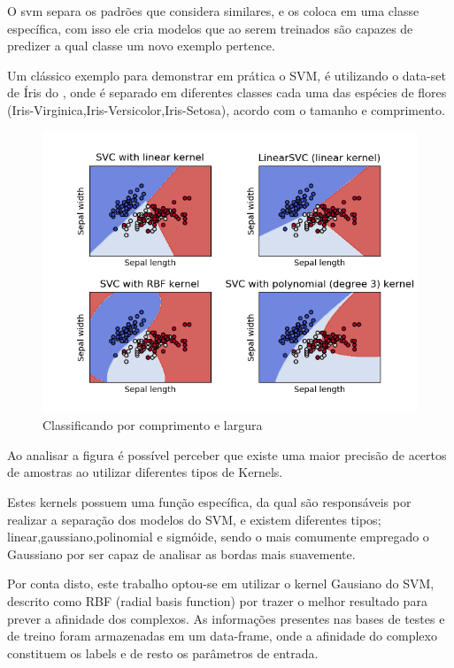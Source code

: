 \documentclass[tcc, capa]{texucpel}
\begin{document}
O svm separa os padrões que considera similares, e os coloca em uma classe específica, com isso ele cria modelos que ao serem treinados são capazes de predizer a qual classe um novo exemplo pertence.\cite{boser1992training}

Um clássico exemplo para demonstrar em prática o SVM, é utilizando o data-set de Íris do \cite{fisher1936use}, onde é separado em diferentes classes cada uma das espécies de flores (Iris-Virginica,Iris-Versicolor,Iris-Setosa), acordo com o tamanho e comprimento. 

    \begin{figure}[!htb]
	\centering\includegraphics[width=15cm]{imagens/exemplo_svm.png}
	\caption{Classificando por comprimento e largura}
	\end{figure}

Ao analisar a figura é possível perceber que existe uma maior precisão de acertos de amostras ao utilizar diferentes tipos de Kernels.

Estes kernels possuem uma função específica, da qual são responsáveis por realizar a separação dos modelos do SVM, e existem diferentes tipos; linear,gaussiano,polinomial e sigmóide, sendo o mais comumente empregado o Gaussiano por ser capaz de analisar as bordas mais suavemente. %

Por conta disto, este trabalho optou-se em utilizar o kernel Gausiano do SVM, descrito como RBF (radial basis function) 
por trazer o melhor resultado para prever a afinidade dos complexos.
As informações presentes nas bases de testes e de treino foram armazenadas em um data-frame, onde a afinidade do complexo constituem os labels e de resto os parâmetros de entrada. 
\end{document}
